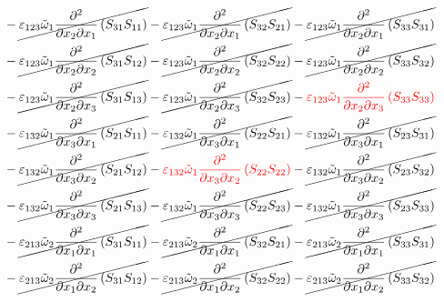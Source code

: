 \begin{equation}
	\begin{split}
&		-\cancel{\varepsilon_{123}\tilde{\omega}_{1}\pdv{}{x_{2}}{x_{1}}\left(S_{31}S_{11}\right)}
		-\cancel{\varepsilon_{123}\tilde{\omega}_{1}\pdv{}{x_{2}}{x_{1}}\left(S_{32}S_{21}\right)}
		-\cancel{\varepsilon_{123}\tilde{\omega}_{1}\pdv{}{x_{2}}{x_{1}}\left(S_{33}S_{31}\right)}\\
&		-\cancel{\varepsilon_{123}\tilde{\omega}_{1}\pdv{}{x_{2}}{x_{2}}\left(S_{31}S_{12}\right)}
		-\cancel{\varepsilon_{123}\tilde{\omega}_{1}\pdv{}{x_{2}}{x_{2}}\left(S_{32}S_{22}\right)}
		-\cancel{\varepsilon_{123}\tilde{\omega}_{1}\pdv{}{x_{2}}{x_{2}}\left(S_{33}S_{32}\right)}\\
&		-\cancel{\varepsilon_{123}\tilde{\omega}_{1}\pdv{}{x_{2}}{x_{3}}\left(S_{31}S_{13}\right)}
		-\cancel{\varepsilon_{123}\tilde{\omega}_{1}\pdv{}{x_{2}}{x_{3}}\left(S_{32}S_{23}\right)}
		-{\color{red}\varepsilon_{123}\tilde{\omega}_{1}\pdv{}{x_{2}}{x_{3}}\left(S_{33}S_{33}\right)}\\
&		-\cancel{\varepsilon_{132}\tilde{\omega}_{1}\pdv{}{x_{3}}{x_{1}}\left(S_{21}S_{11}\right)}
		-\cancel{\varepsilon_{132}\tilde{\omega}_{1}\pdv{}{x_{3}}{x_{1}}\left(S_{22}S_{21}\right)}
		-\cancel{\varepsilon_{132}\tilde{\omega}_{1}\pdv{}{x_{3}}{x_{1}}\left(S_{23}S_{31}\right)}\\
&		-\cancel{\varepsilon_{132}\tilde{\omega}_{1}\pdv{}{x_{3}}{x_{2}}\left(S_{21}S_{12}\right)}
		-{\color{red}\varepsilon_{132}\tilde{\omega}_{1}\pdv{}{x_{3}}{x_{2}}\left(S_{22}S_{22}\right)}
		-\cancel{\varepsilon_{132}\tilde{\omega}_{1}\pdv{}{x_{3}}{x_{2}}\left(S_{23}S_{32}\right)}\\
&		-\cancel{\varepsilon_{132}\tilde{\omega}_{1}\pdv{}{x_{3}}{x_{3}}\left(S_{21}S_{13}\right)}
		-\cancel{\varepsilon_{132}\tilde{\omega}_{1}\pdv{}{x_{3}}{x_{3}}\left(S_{22}S_{23}\right)}
		-\cancel{\varepsilon_{132}\tilde{\omega}_{1}\pdv{}{x_{3}}{x_{3}}\left(S_{23}S_{33}\right)}\\
&		-\cancel{\varepsilon_{213}\tilde{\omega}_{2}\pdv{}{x_{1}}{x_{1}}\left(S_{31}S_{11}\right)}
		-\cancel{\varepsilon_{213}\tilde{\omega}_{2}\pdv{}{x_{1}}{x_{1}}\left(S_{32}S_{21}\right)}
		-\cancel{\varepsilon_{213}\tilde{\omega}_{2}\pdv{}{x_{1}}{x_{1}}\left(S_{33}S_{31}\right)}\\
&		-\cancel{\varepsilon_{213}\tilde{\omega}_{2}\pdv{}{x_{1}}{x_{2}}\left(S_{31}S_{12}\right)}
		-\cancel{\varepsilon_{213}\tilde{\omega}_{2}\pdv{}{x_{1}}{x_{2}}\left(S_{32}S_{22}\right)}
		-\cancel{\varepsilon_{213}\tilde{\omega}_{2}\pdv{}{x_{1}}{x_{2}}\left(S_{33}S_{32}\right)}\\

\end{split}
\end{equation}
